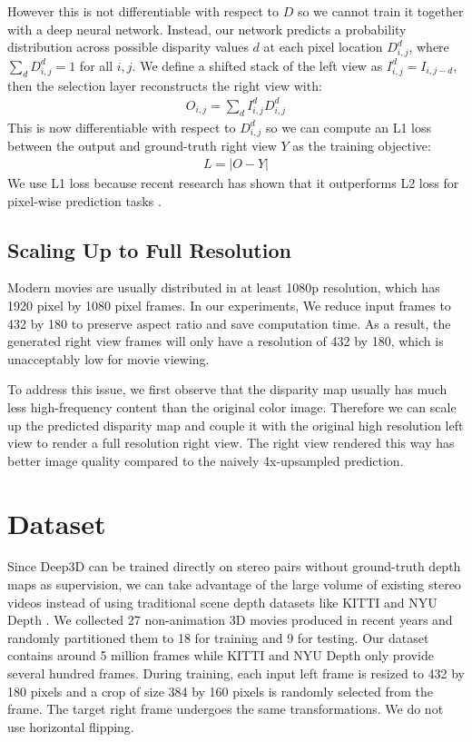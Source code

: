 \documentclass[runningheads]{llncs}
\begin{document}
However this is not differentiable with respect to $D$ so we cannot train it together with a deep neural network.
Instead, our network predicts a probability distribution across possible disparity values $d$ at each pixel location $D_{i,j}^d$, where $\sum_d D_{i,j}^d = 1$ for all $i, j$.
We define a shifted stack of the left view as $I_{i,j}^d = I_{i,j-d}$, then the selection layer reconstructs the right view with:
\begin{eqnarray}
O_{i,j} = \sum_d I_{i,j}^d D_{i,j}^d
\end{eqnarray}
This is now differentiable with respect to $D_{i,j}^d$ so we can compute an L1 loss between the output and ground-truth right view $Y$ as the training objective:
\begin{eqnarray}
L = \vert O - Y \vert
\end{eqnarray}
We use L1 loss because recent research has shown that it outperforms L2 loss for pixel-wise prediction tasks \cite{mathieu2015deep}.

\subsection{Scaling Up to Full Resolution}\label{sec:scale}
Modern movies are usually distributed in at least 1080p resolution, which has 1920 pixel by 1080 pixel frames.
In our experiments, We reduce input frames to 432 by 180 to preserve aspect ratio and save computation time.
As a result, the generated right view frames will only have a resolution of 432 by 180, which is unacceptably low for movie viewing.

To address this issue, we first observe that the disparity map usually has much less high-frequency content than the original color image.
Therefore we can scale up the predicted disparity map and couple it with the original high resolution left view to render a full resolution right view.
The right view rendered this way has better image quality compared to the naively 4x-upsampled prediction.

\section{Dataset}
Since Deep3D can be trained directly on stereo pairs without ground-truth depth maps as supervision,
we can take advantage of the large volume of existing stereo videos instead of using traditional scene depth datasets like KITTI \cite{Geiger2013IJRR} and NYU Depth \cite{Silberman:ECCV12}.
We collected 27 non-animation 3D movies produced in recent years and randomly partitioned them to 18 for training and 9 for testing.
Our dataset contains around 5 million frames while KITTI and NYU Depth only provide several hundred frames.
During training, each input left frame is resized to 432 by 180 pixels and a crop of size 384 by 160 pixels is randomly selected from the frame.
The target right frame undergoes the same transformations.
We do not use horizontal flipping.
\end{document}

